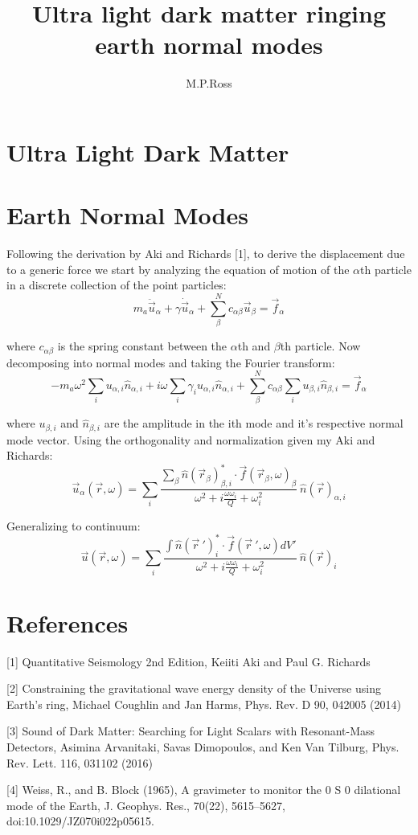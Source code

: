 \documentclass{article}
\title{Ultra light dark matter ringing earth normal modes}
\author{M.P.Ross}
\begin{document}
\maketitle
\section{Ultra Light Dark Matter}

\section{Earth Normal Modes}
Following the derivation by Aki and Richards [1], to derive the displacement due to a generic force we start by analyzing the equation of motion of the $\alpha$th particle in a discrete collection of the point particles:
\[m_a \ddot{ \vec {u}}_\alpha+\gamma\dot{ \vec {u}}_\alpha+\sum^N_\beta c_{\alpha \beta} \vec{u}_\beta=\vec{f}_\alpha\] 

where $c_{\alpha \beta}$ is the spring constant between the $\alpha$th and $\beta$th particle. Now decomposing into normal modes and taking the Fourier transform:
\[-m_a \omega^2 \sum_i u_{\alpha,i}\hat {n}_{\alpha,i}+i \omega \sum_i \gamma_i u_{\alpha,i}\hat {n}_{\alpha,i}+\sum^N_\beta c_{\alpha \beta} \sum_i u_{\beta,i}\hat {n}_{\beta,i}=\vec{f}_\alpha\]

where $u_{\beta,i}$ and $\hat {n}_{\beta,i}$ are the amplitude in the ith mode and it's respective normal mode vector. Using the orthogonality and normalization given my Aki and Richards:
\[\vec u_{\alpha}(\vec r,\omega)=\sum_i\frac{\sum_\beta \hat{n}(\vec r_\beta)_{\beta,i} ^*\cdot\vec{f}(\vec r_\beta,\omega)_\beta}{\omega^2 +i\frac{\omega \omega_i}{Q} +\omega_i^2}\ \hat {n}(\vec r)_{\alpha,i}\]

Generalizing to continuum:
\[\vec u(\vec r,\omega)=\sum_i\frac{\int \hat{n}(\vec r\ ')_{i} ^*\cdot\vec{f}(\vec r\ ',\omega) dV '}{\omega^2 +i\frac{\omega \omega_i}{Q} +\omega_i^2}\ \hat {n}(\vec r)_{i}\]
\section{References}
[1] Quantitative Seismology 2nd Edition, Keiiti Aki and Paul G. Richards

[2] Constraining the gravitational wave energy density of the Universe using Earth’s ring, Michael Coughlin and Jan Harms, Phys. Rev. D 90, 042005 (2014) 

[3] Sound of Dark Matter: Searching for Light Scalars with Resonant-Mass Detectors, Asimina Arvanitaki, Savas Dimopoulos, and Ken Van Tilburg, Phys. Rev. Lett. 116, 031102 (2016)

[4] Weiss, R., and B. Block (1965), A gravimeter to monitor the 0 S 0 dilational mode of the Earth, J. Geophys. Res., 70(22), 5615–5627, doi:10.1029/JZ070i022p05615.
\end{document}
